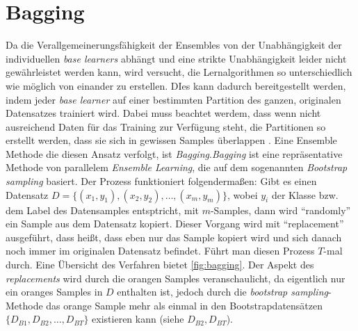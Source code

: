\section{Bagging}
Da die Verallgemeinerungsfähigkeit der Ensembles von der Unabhängigkeit der individuellen \textit{base learners} abhängt und eine strikte Unabhängigkeit leider nicht gewährleistet werden kann, wird versucht, die Lernalgorithmen so unterschiedlich wie möglich von einander zu erstellen. DIes kann dadurch bereitgestellt werden, indem jeder \textit{base learner} auf einer bestimmten Partition des ganzen, originalen Datensatzes trainiert wird. Dabei muss beachtet werdem, dass wenn nicht ausreichend Daten für das Training zur Verfügung steht, die Partitionen so erstellt werden, dass sie sich in gewissen Samples überlappen \autocite[vgl. S.189]{Zhou.2021}. Eine Ensemble Methode die diesen Ansatz verfolgt, ist \textit{Bagging}\autocite[]{Breiman.1996}.\textit{Bagging} ist eine repräsentative Methode von parallelem \textit{Ensemble Learning}, die auf dem sogenannten \textit{Bootstrap sampling} basiert. Der Prozess funktioniert folgendermaßen: Gibt es einen Datensatz $D = \{(x_1,y_1), (x_2,y_2), \dots, (x_m,y_m)\}$, wobei $y_i$ der Klasse bzw. dem Label des Datensamples entsptricht, mit $m$-Samples, dann wird 
\enquote{randomly}\autocite[S.190]{Zhou.2021} ein Sample aus dem Datensatz kopiert. Dieser Vorgang wird mit \enquote{replacement}\autocite[S.1]{Breiman.1996} ausgeführt, dass heißt, dass eben nur das Sample kopiert wird und sich danach noch immer im originalen Datensatz befindet. Führt man diesen Prozess $T$-mal durch. Eine Übersicht des Verfahren bietet \autoref{fig:bagging}. Der Aspekt des \textit{replacements} wird durch die orangen Samples veranschaulicht, da eigentlich nur ein oranges Samples in $D$ enthalten ist, jedoch durch die \textit{bootstrap sampling}-Methode das orange Sample mehr als einmal in den Bootstrapdatensätzen $\{{D_{B1}, D_{B2}, \dots, D_{BT}\}}$ existieren kann (siehe $D_{B2}, D_{BT}$).

